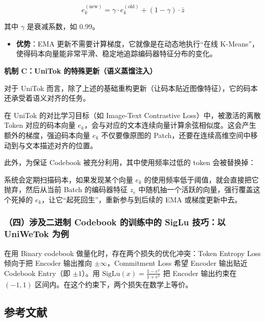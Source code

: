 \[
e_k^{(\mathrm{new})}
=\gamma\cdot e_k^{(\mathrm{old})}+(1-\gamma)\cdot\bar z
\]

其中 \(\gamma\) 是衰减系数，如 0.99。

\begin{itemize}
\tightlist
\item
  \textbf{优势}：EMA 更新不需要计算梯度，它就像是在动态地执行``在线 K-Means''，使得码本向量能非常平滑、稳定地追踪编码器特征分布的变化。
\end{itemize}

\textbf{机制 C：UniTok 的特殊更新（语义蒸馏注入）}

对于 UniTok 而言，除了上述的基础重构更新（让码本贴近图像特征），它的码本还承受着语义对齐的任务。

在 UniTok 的对比学习目标（如 Image-Text Contrastive Loss）中，被激活的离散 Token 对应的码本向量 \(e_k\)，会与对应的文本连续向量计算余弦相似度。这会产生额外的梯度，强迫码本向量 \(e_k\) 不仅要像原图的 Patch，还要在连续高维空间中移动到与文本描述对齐的位置。

此外，为保证 Codebook 被充分利用，其中使用频率过低的 token 会被替换掉：

系统会定期扫描码本，如果发现某个向量 \(e_k\) 的使用频率低于阈值，就会直接把它抛弃，然后从当前 Batch 的编码器特征 \(z_e\) 中随机抽一个活跃的向量，强行覆盖这个死掉的 \(e_k\)，让它``起死回生''，重新参与到后续的 EMA 或梯度更新中去。

\hypertarget{ux56dbux6d89ux53caux4e8cux8fdbux5236-codebook-ux7684ux8badux7ec3ux4e2dux7684-siglu-ux6280ux5de7ux4ee5-uniwetok-ux4e3aux4f8b}{%
\subsubsection{（四）涉及二进制 Codebook 的训练中的 SigLu 技巧：以 UniWeTok 为例}\label{ux56dbux6d89ux53caux4e8cux8fdbux5236-codebook-ux7684ux8badux7ec3ux4e2dux7684-siglu-ux6280ux5de7ux4ee5-uniwetok-ux4e3aux4f8b}}

在用 Binary codebook 做量化时，存在两个损失的优化冲突：Token Entropy Loss 倾向于把 Encoder 输出推向 \(\pm\infty\)，Commitment Loss 希望 Encoder 输出贴近 Codebook Entry（即 \(\pm1\)）。用 \(\mathrm{SigLu}(x)=\frac{1-e^x}{1+e^x}\) 把 Encoder 输出约束在 \((-1,1)\) 区间内。在这个约束下，两个损失在数学上等价。

\hypertarget{ux53c2ux8003ux6587ux732e-193}{%
\subsection{参考文献}\label{ux53c2ux8003ux6587ux732e-193}}

